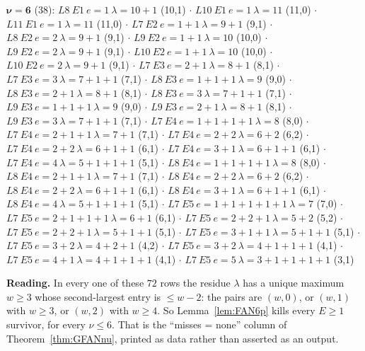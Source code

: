 {\noindent
$\boldsymbol{\nu = 6}$ (38):\quad
$L8\ E1\ e{=}1\ \lambda{=}10{+}1$ (10,1) $\cdot$
$L10\ E1\ e{=}1\ \lambda{=}11$ (11,0) $\cdot$
$L11\ E1\ e{=}1\ \lambda{=}11$ (11,0) $\cdot$
$L7\ E2\ e{=}1{+}1\ \lambda{=}9{+}1$ (9,1) $\cdot$
$L8\ E2\ e{=}2\ \lambda{=}9{+}1$ (9,1) $\cdot$
$L9\ E2\ e{=}1{+}1\ \lambda{=}10$ (10,0) $\cdot$
$L9\ E2\ e{=}2\ \lambda{=}9{+}1$ (9,1) $\cdot$
$L10\ E2\ e{=}1{+}1\ \lambda{=}10$ (10,0) $\cdot$
$L10\ E2\ e{=}2\ \lambda{=}9{+}1$ (9,1) $\cdot$
$L7\ E3\ e{=}2{+}1\ \lambda{=}8{+}1$ (8,1) $\cdot$
$L7\ E3\ e{=}3\ \lambda{=}7{+}1{+}1$ (7,1) $\cdot$
$L8\ E3\ e{=}1{+}1{+}1\ \lambda{=}9$ (9,0) $\cdot$
$L8\ E3\ e{=}2{+}1\ \lambda{=}8{+}1$ (8,1) $\cdot$
$L8\ E3\ e{=}3\ \lambda{=}7{+}1{+}1$ (7,1) $\cdot$
$L9\ E3\ e{=}1{+}1{+}1\ \lambda{=}9$ (9,0) $\cdot$
$L9\ E3\ e{=}2{+}1\ \lambda{=}8{+}1$ (8,1) $\cdot$
$L9\ E3\ e{=}3\ \lambda{=}7{+}1{+}1$ (7,1) $\cdot$
$L7\ E4\ e{=}1{+}1{+}1{+}1\ \lambda{=}8$ (8,0) $\cdot$
$L7\ E4\ e{=}2{+}1{+}1\ \lambda{=}7{+}1$ (7,1) $\cdot$
$L7\ E4\ e{=}2{+}2\ \lambda{=}6{+}2$ (6,2) $\cdot$
$L7\ E4\ e{=}2{+}2\ \lambda{=}6{+}1{+}1$ (6,1) $\cdot$
$L7\ E4\ e{=}3{+}1\ \lambda{=}6{+}1{+}1$ (6,1) $\cdot$
$L7\ E4\ e{=}4\ \lambda{=}5{+}1{+}1{+}1$ (5,1) $\cdot$
$L8\ E4\ e{=}1{+}1{+}1{+}1\ \lambda{=}8$ (8,0) $\cdot$
$L8\ E4\ e{=}2{+}1{+}1\ \lambda{=}7{+}1$ (7,1) $\cdot$
$L8\ E4\ e{=}2{+}2\ \lambda{=}6{+}2$ (6,2) $\cdot$
$L8\ E4\ e{=}2{+}2\ \lambda{=}6{+}1{+}1$ (6,1) $\cdot$
$L8\ E4\ e{=}3{+}1\ \lambda{=}6{+}1{+}1$ (6,1) $\cdot$
$L8\ E4\ e{=}4\ \lambda{=}5{+}1{+}1{+}1$ (5,1) $\cdot$
$L7\ E5\ e{=}1{+}1{+}1{+}1{+}1\ \lambda{=}7$ (7,0) $\cdot$
$L7\ E5\ e{=}2{+}1{+}1{+}1\ \lambda{=}6{+}1$ (6,1) $\cdot$
$L7\ E5\ e{=}2{+}2{+}1\ \lambda{=}5{+}2$ (5,2) $\cdot$
$L7\ E5\ e{=}2{+}2{+}1\ \lambda{=}5{+}1{+}1$ (5,1) $\cdot$
$L7\ E5\ e{=}3{+}1{+}1\ \lambda{=}5{+}1{+}1$ (5,1) $\cdot$
$L7\ E5\ e{=}3{+}2\ \lambda{=}4{+}2{+}1$ (4,2) $\cdot$
$L7\ E5\ e{=}3{+}2\ \lambda{=}4{+}1{+}1{+}1$ (4,1) $\cdot$
$L7\ E5\ e{=}4{+}1\ \lambda{=}4{+}1{+}1{+}1$ (4,1) $\cdot$
$L7\ E5\ e{=}5\ \lambda{=}3{+}1{+}1{+}1{+}1$ (3,1)
\par}

\medskip
\noindent
\textbf{Reading.} In every one of these $72$ rows the residue $\lambda$ has a unique maximum
$w \ge 3$ whose second-largest entry is $\le w-2$: the pairs are $(w,0)$, or $(w,1)$ with
$w \ge 3$, or $(w,2)$ with $w \ge 4$. So Lemma~\ref{lem:FAN6p} kills every $E \ge 1$
survivor, for every $\nu \le 6$. That is the ``misses = none'' column of
Theorem~\ref{thm:GFANnu}, printed as data rather than asserted as an output.

